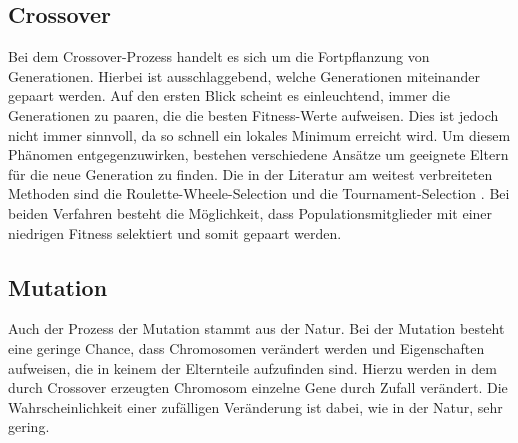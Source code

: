 \subsection{Crossover}
\label{chap:grundlagen_cossover}
Bei dem Crossover-Prozess handelt es sich um die Fortpflanzung von Generationen. Hierbei ist ausschlaggebend, welche Generationen miteinander gepaart werden. Auf den ersten Blick scheint es einleuchtend, immer die Generationen zu paaren, die die besten Fitness-Werte aufweisen. Dies ist jedoch nicht immer sinnvoll, da so schnell ein lokales Minimum erreicht wird. Um diesem Phänomen entgegenzuwirken, bestehen verschiedene Ansätze um geeignete Eltern für die neue Generation zu finden.\cite{davis1991handbook}
Die in der Literatur am weitest verbreiteten Methoden sind die Roulette-Wheele-Selection und die Tournament-Selection \cite{zhong2005comparison}. Bei beiden Verfahren besteht die Möglichkeit, dass Populationsmitglieder mit einer niedrigen Fitness selektiert und somit gepaart werden.

\subsection{Mutation}
Auch der Prozess der Mutation stammt aus der Natur. Bei der Mutation besteht eine geringe Chance, dass Chromosomen verändert werden und Eigenschaften aufweisen, die in keinem der Elternteile aufzufinden sind. Hierzu werden in dem durch Crossover erzeugten Chromosom einzelne Gene durch Zufall verändert. Die Wahrscheinlichkeit einer zufälligen Veränderung ist dabei, wie in der Natur, sehr gering.\cite{davis1991handbook}


